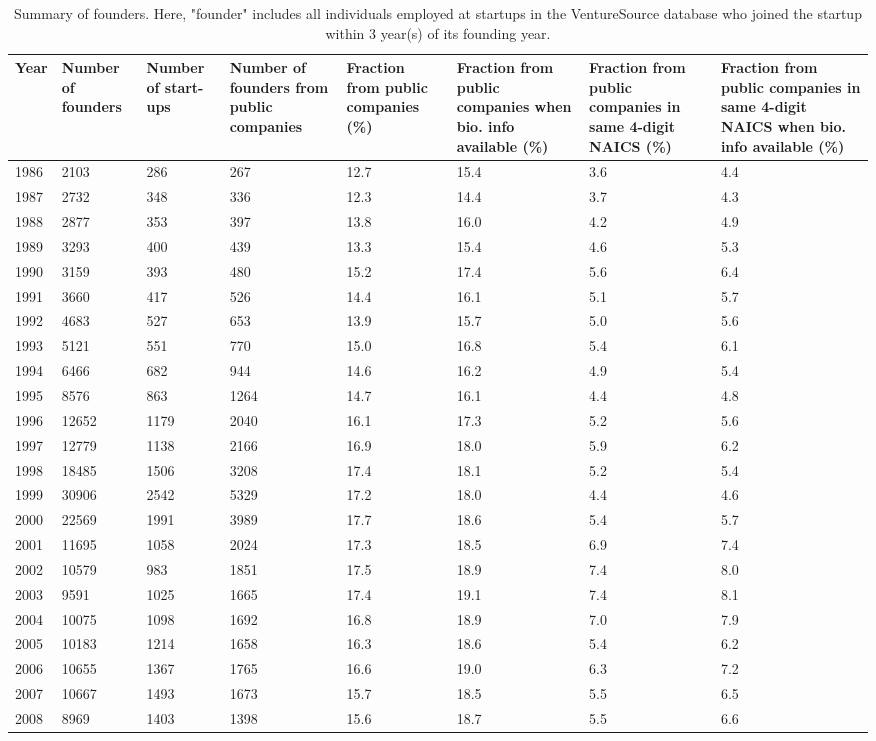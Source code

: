\begin{table}[!htb]
\centering
\begingroup\scriptsize
\begin{tabular}{p{1.75cm}p{1.75cm}p{1.75cm}p{1.75cm}p{1.75cm}p{1.75cm}p{1.75cm}p{1.75cm}}
  \toprule
Year & Number of founders & Number of start-ups & Number of founders from public companies & Fraction from public companies (\%) & Fraction from public companies when bio. info available (\%) & Fraction from public companies in same 4-digit NAICS (\%) & Fraction from public companies in same 4-digit NAICS when bio. info available (\%) \\ 
  \midrule
1986 & 2103 & 286 & 267 & 12.7 & 15.4 & 3.6 & 4.4 \\ 
  1987 & 2732 & 348 & 336 & 12.3 & 14.4 & 3.7 & 4.3 \\ 
  1988 & 2877 & 353 & 397 & 13.8 & 16.0 & 4.2 & 4.9 \\ 
  1989 & 3293 & 400 & 439 & 13.3 & 15.4 & 4.6 & 5.3 \\ 
  1990 & 3159 & 393 & 480 & 15.2 & 17.4 & 5.6 & 6.4 \\ 
  1991 & 3660 & 417 & 526 & 14.4 & 16.1 & 5.1 & 5.7 \\ 
  1992 & 4683 & 527 & 653 & 13.9 & 15.7 & 5.0 & 5.6 \\ 
  1993 & 5121 & 551 & 770 & 15.0 & 16.8 & 5.4 & 6.1 \\ 
  1994 & 6466 & 682 & 944 & 14.6 & 16.2 & 4.9 & 5.4 \\ 
  1995 & 8576 & 863 & 1264 & 14.7 & 16.1 & 4.4 & 4.8 \\ 
  1996 & 12652 & 1179 & 2040 & 16.1 & 17.3 & 5.2 & 5.6 \\ 
  1997 & 12779 & 1138 & 2166 & 16.9 & 18.0 & 5.9 & 6.2 \\ 
  1998 & 18485 & 1506 & 3208 & 17.4 & 18.1 & 5.2 & 5.4 \\ 
  1999 & 30906 & 2542 & 5329 & 17.2 & 18.0 & 4.4 & 4.6 \\ 
  2000 & 22569 & 1991 & 3989 & 17.7 & 18.6 & 5.4 & 5.7 \\ 
  2001 & 11695 & 1058 & 2024 & 17.3 & 18.5 & 6.9 & 7.4 \\ 
  2002 & 10579 & 983 & 1851 & 17.5 & 18.9 & 7.4 & 8.0 \\ 
  2003 & 9591 & 1025 & 1665 & 17.4 & 19.1 & 7.4 & 8.1 \\ 
  2004 & 10075 & 1098 & 1692 & 16.8 & 18.9 & 7.0 & 7.9 \\ 
  2005 & 10183 & 1214 & 1658 & 16.3 & 18.6 & 5.4 & 6.2 \\ 
  2006 & 10655 & 1367 & 1765 & 16.6 & 19.0 & 6.3 & 7.2 \\ 
  2007 & 10667 & 1493 & 1673 & 15.7 & 18.5 & 5.5 & 6.5 \\ 
  2008 & 8969 & 1403 & 1398 & 15.6 & 18.7 & 5.5 & 6.6 \\ 
   \bottomrule
\end{tabular}
\endgroup
\caption{Summary of founders. Here, "founder" includes all individuals employed at startups in the VentureSource database who joined the startup within 3 year(s) of its founding year.} 
\label{table:GStable_all}
\end{table}
